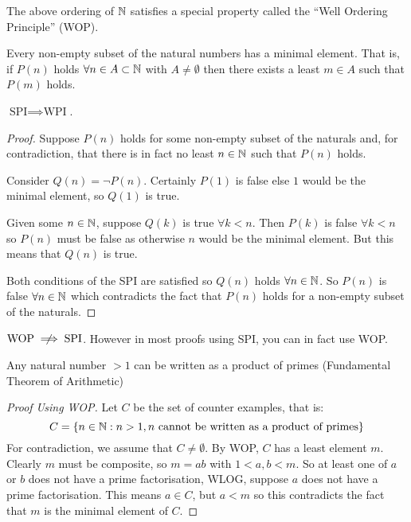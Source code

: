 \documentclass[../main.tex]{subfiles}
\begin{document}
The above ordering of $\mathbb{N}$ satisfies a special property called the ``Well Ordering Principle'' (WOP).
\begin{definition}
  Every non-empty subset of the natural numbers has a minimal element.
  That is, if $P(n)$ holds $\forall n \in  A \subset \mathbb{N}$ with $A \neq \emptyset$ then there exists a least $m \in A$ such that $P(m)$ holds.
\end{definition}
\begin{theorem}
  $\text{SPI} \implies \text{WPI}$.
\end{theorem}
\begin{proof}
  Suppose $P(n)$ holds for some non-empty subset of the naturals and, for contradiction, that there is in fact no least $n \in \mathbb{N}$ such that $P(n)$ holds.

  Consider $Q(n) = \lnot P(n)$.
  Certainly $P(1)$ is false else $1$ would be the minimal element, so $Q(1)$ is true.

  Given some $n \in \mathbb{N}$, suppose $Q(k)$ is true $\forall k < n$.
  Then $P(k)$ is false $\forall k < n$ so $P(n)$ must be false as otherwise $n$ would be the minimal element.
  But this means that $Q(n)$ is true.

  Both conditions of the SPI are satisfied so $Q(n)$ holds $\forall n \in \mathbb{N}$.
  So $P(n)$ is false $\forall n \in \mathbb{N}$ which contradicts the fact that $P(n)$ holds for a non-empty subset of the naturals.
\end{proof}
\begin{remark}
  $\text{WOP} \centernot\implies \text{SPI}$.
  However in most proofs using SPI, you can in fact use WOP.
\end{remark}
\begin{example}
  Any natural number $>1$ can be written as a product of primes (Fundamental Theorem of Arithmetic)
\end{example}
\begin{proof}[Proof Using WOP]
  Let $C$ be the set of counter examples, that is:
  \[
    C = \{n \in \mathbb{N}: n > 1, n \text{ cannot be written as a product of primes}\}
  \]
  For contradiction, we assume that $C \neq \emptyset$.
  By WOP, $C$ has a least element $m$.
  Clearly $m$ must be composite, so $m = ab$ with $1 < a, b < m$.
  So at least one of $a$ or $b$ does not have a prime factorisation, WLOG, suppose $a$ does not have a prime factorisation.
  This means $a \in C$, but $a < m$ so this contradicts the fact that $m$ is the minimal element of $C$.
\end{proof}
\end{document}
